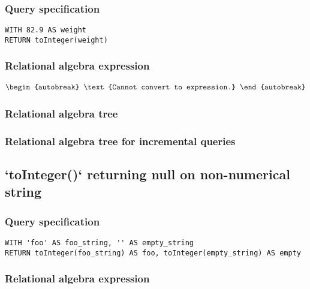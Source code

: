 \subsubsection*{Query specification}

\begin{lstlisting}
WITH 82.9 AS weight
RETURN toInteger(weight)
\end{lstlisting}

\subsubsection*{Relational algebra expression}

\begin{align*}
\begin{autobreak}
\text{Cannot convert to expression.}
\end{autobreak}
\end{align*}

\subsubsection*{Relational algebra tree}


\subsubsection*{Relational algebra tree for incremental queries}


\subsection{`toInteger()` returning null on non-numerical string}

\subsubsection*{Query specification}

\begin{lstlisting}
WITH 'foo' AS foo_string, '' AS empty_string
RETURN toInteger(foo_string) AS foo, toInteger(empty_string) AS empty
\end{lstlisting}

\subsubsection*{Relational algebra expression}

